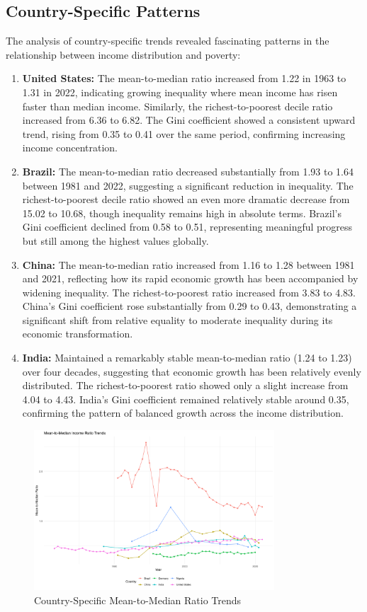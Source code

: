 \documentclass[12pt,a4paper]{article}
\begin{document}
\subsection{Country-Specific Patterns}
The analysis of country-specific trends revealed fascinating patterns in the relationship between income distribution and poverty:
\begin{enumerate}
    \item \textbf{United States:} The mean-to-median ratio increased from 1.22 in 1963 to 1.31 in 2022, indicating growing inequality where mean income has risen faster than median income. Similarly, the richest-to-poorest decile ratio increased from 6.36 to 6.82. The Gini coefficient showed a consistent upward trend, rising from 0.35 to 0.41 over the same period, confirming increasing income concentration.
    \item \textbf{Brazil:} The mean-to-median ratio decreased substantially from 1.93 to 1.64 between 1981 and 2022, suggesting a significant reduction in inequality. The richest-to-poorest decile ratio showed an even more dramatic decrease from 15.02 to 10.68, though inequality remains high in absolute terms. Brazil's Gini coefficient declined from 0.58 to 0.51, representing meaningful progress but still among the highest values globally.
    \item \textbf{China:} The mean-to-median ratio increased from 1.16 to 1.28 between 1981 and 2021, reflecting how its rapid economic growth has been accompanied by widening inequality. The richest-to-poorest ratio increased from 3.83 to 4.83. China's Gini coefficient rose substantially from 0.29 to 0.43, demonstrating a significant shift from relative equality to moderate inequality during its economic transformation.
    \item \textbf{India:} Maintained a remarkably stable mean-to-median ratio (1.24 to 1.23) over four decades, suggesting that economic growth has been relatively evenly distributed. The richest-to-poorest ratio showed only a slight increase from 4.04 to 4.43. India's Gini coefficient remained relatively stable around 0.35, confirming the pattern of balanced growth across the income distribution.
\end{enumerate}

\begin{figure}[h]
\centering
\includegraphics[width=0.8\textwidth]{../output/visualizations/country_mean_median_trends.png}
\caption{Country-Specific Mean-to-Median Ratio Trends}
\end{figure}
\end{document}
